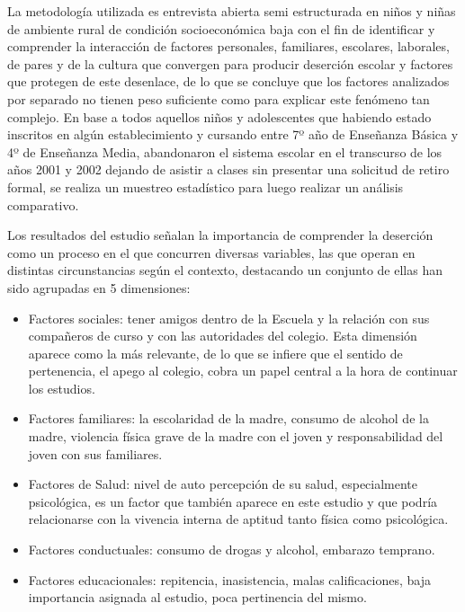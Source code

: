 La metodología utilizada es entrevista abierta semi estructurada en niños y niñas de ambiente rural de condición socioeconómica baja con el fin de identificar y comprender la interacción de factores personales, familiares, escolares, laborales, de pares y de la cultura que convergen para producir deserción escolar y factores que protegen de este desenlace, de lo que se concluye que los factores analizados por separado no tienen peso suficiente como para explicar este fenómeno tan complejo. En base a todos aquellos niños y adolescentes que habiendo estado inscritos en algún establecimiento y cursando entre 7º año de Enseñanza Básica y 4º de Enseñanza Media, abandonaron el sistema escolar en el transcurso de los años 2001 y 2002 dejando de asistir a clases sin presentar una solicitud de retiro formal, se realiza un muestreo estadístico para luego realizar un análisis comparativo.

Los resultados del estudio señalan la importancia de comprender la deserción como un proceso en el que concurren diversas variables, las que operan en distintas circunstancias según el contexto, destacando un conjunto de ellas han sido agrupadas en 5 dimensiones:
\begin{itemize}
\item Factores sociales: tener amigos dentro de la Escuela y la relación con sus compañeros de curso y con las autoridades del colegio. Esta dimensión aparece como la más relevante, de lo que se infiere que el sentido de pertenencia, el apego al colegio, cobra un papel central a la hora de continuar los estudios.  
\item Factores familiares: la escolaridad de la madre, consumo de alcohol de la madre, violencia física grave de la madre con el joven y responsabilidad del joven con sus familiares.
\item Factores de Salud: nivel de auto percepción de su salud, especialmente psicológica, es un factor que también aparece en este estudio y que podría relacionarse con la vivencia interna de aptitud tanto física como psicológica.
\item Factores conductuales: consumo de drogas y alcohol, embarazo temprano.
\item Factores educacionales: repitencia, inasistencia, malas calificaciones, baja importancia asignada al estudio, poca pertinencia del mismo.
\end{itemize}

